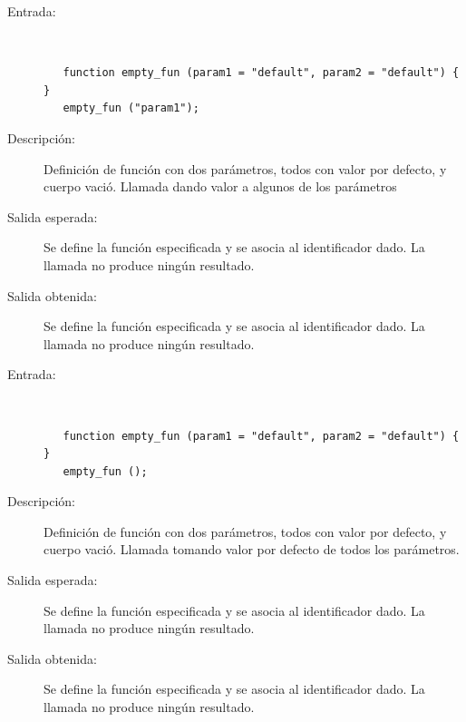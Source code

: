 \begin{framed}
	\begin{description}
		\item [Entrada:] \hfill \\
\begin{lstlisting}
   function empty_fun (param1 = "default", param2 = "default") { } 
   empty_fun ("param1");
\end{lstlisting}
		\item [Descripción:] Definición de función con dos parámetros, todos con valor por defecto, y cuerpo vació. Llamada dando valor a algunos de los parámetros
		\item [Salida esperada:] Se define la función especificada y se asocia al identificador dado. La llamada no produce ningún resultado.
		\item [Salida obtenida:] Se define la función especificada y se asocia al identificador dado. La llamada no produce ningún resultado.
	\end{description}
\end{framed}

\begin{framed}
	\begin{description}
		\item [Entrada:] \hfill \\
\begin{lstlisting}
   function empty_fun (param1 = "default", param2 = "default") { } 
   empty_fun ();
\end{lstlisting}
		\item [Descripción:] Definición de función con dos parámetros, todos con valor por defecto, y cuerpo vació. Llamada tomando valor por defecto de todos los parámetros.
		\item [Salida esperada:] Se define la función especificada y se asocia al identificador dado. La llamada no produce ningún resultado. 
		\item [Salida obtenida:] Se define la función especificada y se asocia al identificador dado. La llamada no produce ningún resultado.
	\end{description}
\end{framed}

